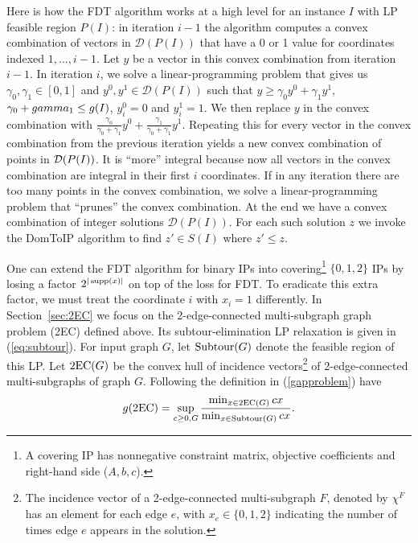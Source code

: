 Here is how the FDT algorithm works at a high level for an instance $I$ with LP feasible region $P(I)$: in iteration $i-1$ the algorithm computes a convex combination of vectors in $\mathcal{D}(P(I))$ that have a 0 or 1 value for coordinates indexed $1,\ldots,i-1$. Let $y$ be a vector in this convex combination from iteration $i-1$. In iteration $i$, we solve a linear-programming problem that gives us $\gamma_0,\gamma_1\in [0,1]$ and $y^0,y^1\in \mathcal{D}(P(I))$ such that $y\geq \gamma_0 y^0 + \gamma_1 y^1$, $\gamma_0+\\gamma_1\leq g(I)$, $y^0_i=0$ and $y^1_i=1$. We then replace $y$ in the convex combination with $\frac{\gamma_0}{\gamma_0+\gamma_1}y^0 +\frac{\gamma_1}{\gamma_0+\gamma_1}y^1$.  Repeating this for every vector in the convex combination from the previous iteration yields a new convex combination of points in $\operatorname{\mathcal{D}}(P(I))$. It is ``more'' integral because now all vectors in the convex combination are integral in their first $i$ coordinates. If in any iteration there are too many points in the convex combination,  we solve a linear-programming problem that ``prunes'' the convex combination. At the end we have a convex combination of integer solutions $\mathcal{D}(P(I))$. For each such solution $z$ we invoke the DomToIP algorithm
to find $z'\in S(I)$ where $z'\leq z$.


One can extend the FDT algorithm for binary IPs into covering\footnote{A covering IP has nonnegative constraint matrix, objective coefficients and right-hand side ($A,b,c$).} $\{0,1,2\}$ IPs by losing a factor $2^{|\operatorname{supp}(x)|}$ on top of the loss for FDT. To eradicate this extra factor, we must treat the coordinate $i$ with $x_i=1$ differently. In Section~\ref{sec:2EC} we focus on the 2-edge-connected multi-subgraph graph problem (2EC) defined above.  Its subtour-elimination LP relaxation is given in (\ref{eq:subtour}).
For input graph $G$, let $\operatorname{{Subtour}}(G)$ denote the feasible region of this LP. Let $\2ec(G)$ be the convex hull of incidence vectors\footnote{The incidence vector of a 2-edge-connected multi-subgraph $F$, denoted by $\chi^F$ has an element for each edge $e$, with $x_e \in \{0,1,2\}$ indicating the number of times edge $e$ appears in the solution.} of 2-edge-connected multi-subgraphs of graph $G$. Following the definition in (\ref{gapproblem}) have
\begin{equation}
g(\2ec) = \sup_{c\geq 0 , G}\frac{\min_{x\in \2ec(G)} cx}{\min_{x\in \subtour(G)} cx}.
\end{equation}


